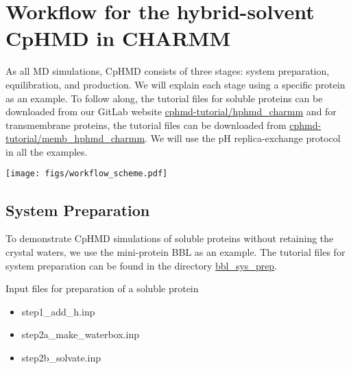 \section{Workflow for the hybrid-solvent CpHMD in CHARMM} 
As all MD simulations, CpHMD consists of three stages: system preparation, equilibration, and production.
We will explain each stage using a specific protein as an example. 
To follow along, the tutorial files for soluble proteins can be 
downloaded from our GitLab website \href{https://gitlab.com/shenlab-amber-cphmd/cphmd-tutorial/-/tree/main/hphmd_charmm}{cphmd-tutorial/hphmd\_charmm}
and for transmembrane proteins, 
the tutorial files can be downloaded from \href{https://gitlab.com/shenlab-amber-cphmd/cphmd-tutorial/-/tree/main/memb_hphmd_charmm}{cphmd-tutorial/memb\_hphmd\_charmm}.
We will use the pH replica-exchange protocol \cite{Wallace_Shen_2011_J.Chem.TheoryComput.}
in all the examples.

\begin{figure*}[htb!]
    \centering
    \texttt{[image: figs/workflow\_scheme.pdf]}
    \caption{\textbf{Overview of the CpHMD workflow} 
    }
    \label{fig:intro}
\end{figure*}


\subsection{System Preparation}

To demonstrate CpHMD simulations of 
soluble proteins without retaining the crystal waters,
we use the mini-protein BBL as an example.
The tutorial files for system preparation can be found 
in the directory
\href{https://gitlab.com/shenlab-amber-cphmd/cphmd-tutorial/-/tree/main/hphmd_charmm/bbl_sys_prep}{bbl\_sys\_prep}.

\begin{checklist}{Input files for preparation of a soluble protein}
\begin{itemize}
\item step1\_add\_h.inp
\item step2a\_make\_waterbox.inp
\item step2b\_solvate.inp 
\end{itemize}
\end{checklist}

